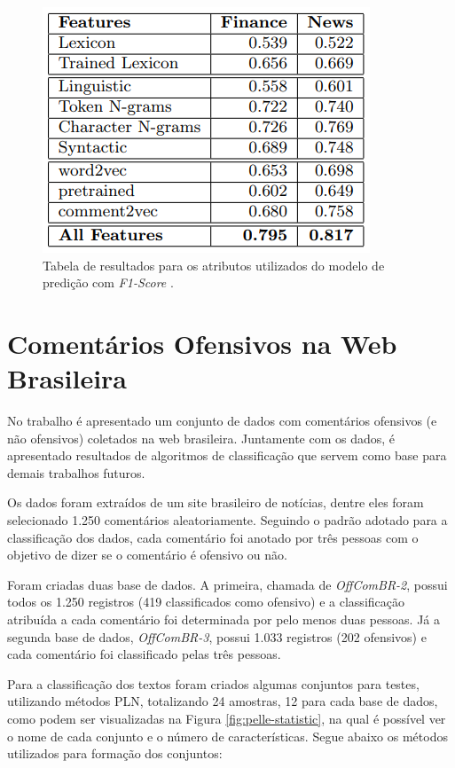 \begin{figure}[ht]
  \centering
  \includegraphics[height=0.3\textheight]{figuras/tabela-modelo-trab2.png}
  \caption{Tabela de resultados para os atributos utilizados do modelo de predição com \textit{F1-Score} \cite{nobata2016abusive}.}
  \label{fig:tb2resultmodel}
\end{figure}


\section{Comentários Ofensivos na Web Brasileira}\label{sec:trabrel-br}
No trabalho \cite{Pelle2017} é apresentado um conjunto de dados com comentários ofensivos (e não ofensivos) coletados na web brasileira. Juntamente com os dados, é apresentado resultados de algoritmos de classificação que servem como base para demais trabalhos futuros.

Os dados foram extraídos de um site brasileiro de notícias, dentre eles foram selecionado 1.250 comentários aleatoriamente. Seguindo o padrão adotado para a classificação dos dados, cada comentário foi anotado por três pessoas com o objetivo de dizer se o comentário é ofensivo ou não.

Foram criadas duas base de dados. A primeira, chamada de {\it OffComBR-2}, possui todos os 1.250 registros (419 classificados como ofensivo) e a classificação atribuída a cada comentário foi determinada por pelo menos duas pessoas. Já a segunda base de dados, {\it OffComBR-3}, possui 1.033 registros (202 ofensivos) e cada comentário foi classificado pelas três pessoas.

Para a classificação dos textos foram criados algumas conjuntos para testes, utilizando métodos PLN, totalizando 24 amostras, 12 para cada base de dados, como podem ser visualizadas na Figura \ref{fig:pelle-statistic}, na qual é possível ver o nome de cada conjunto e o número de características. Segue abaixo os métodos utilizados para formação dos conjuntos:

